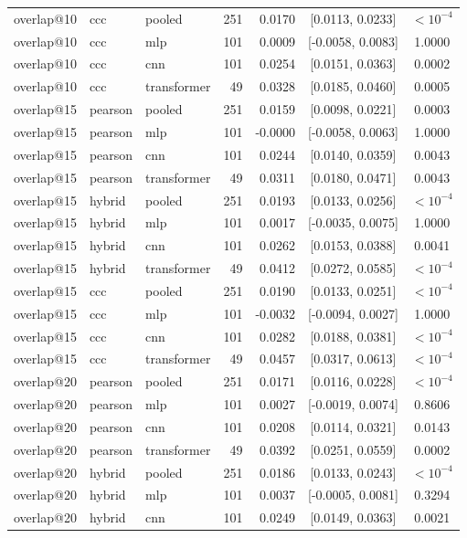 \begin{longtable}{lllrrcc}
overlap@10 & ccc & pooled & 251 & 0.0170 & [0.0113, 0.0233] & $<10^{-4}$ \\
overlap@10 & ccc & mlp & 101 & 0.0009 & [-0.0058, 0.0083] & 1.0000 \\
overlap@10 & ccc & cnn & 101 & 0.0254 & [0.0151, 0.0363] & 0.0002 \\
overlap@10 & ccc & transformer & 49 & 0.0328 & [0.0185, 0.0460] & 0.0005 \\
overlap@15 & pearson & pooled & 251 & 0.0159 & [0.0098, 0.0221] & 0.0003 \\
overlap@15 & pearson & mlp & 101 & -0.0000 & [-0.0058, 0.0063] & 1.0000 \\
overlap@15 & pearson & cnn & 101 & 0.0244 & [0.0140, 0.0359] & 0.0043 \\
overlap@15 & pearson & transformer & 49 & 0.0311 & [0.0180, 0.0471] & 0.0043 \\
overlap@15 & hybrid & pooled & 251 & 0.0193 & [0.0133, 0.0256] & $<10^{-4}$ \\
overlap@15 & hybrid & mlp & 101 & 0.0017 & [-0.0035, 0.0075] & 1.0000 \\
overlap@15 & hybrid & cnn & 101 & 0.0262 & [0.0153, 0.0388] & 0.0041 \\
overlap@15 & hybrid & transformer & 49 & 0.0412 & [0.0272, 0.0585] & $<10^{-4}$ \\
overlap@15 & ccc & pooled & 251 & 0.0190 & [0.0133, 0.0251] & $<10^{-4}$ \\
overlap@15 & ccc & mlp & 101 & -0.0032 & [-0.0094, 0.0027] & 1.0000 \\
overlap@15 & ccc & cnn & 101 & 0.0282 & [0.0188, 0.0381] & $<10^{-4}$ \\
overlap@15 & ccc & transformer & 49 & 0.0457 & [0.0317, 0.0613] & $<10^{-4}$ \\
overlap@20 & pearson & pooled & 251 & 0.0171 & [0.0116, 0.0228] & $<10^{-4}$ \\
overlap@20 & pearson & mlp & 101 & 0.0027 & [-0.0019, 0.0074] & 0.8606 \\
overlap@20 & pearson & cnn & 101 & 0.0208 & [0.0114, 0.0321] & 0.0143 \\
overlap@20 & pearson & transformer & 49 & 0.0392 & [0.0251, 0.0559] & 0.0002 \\
overlap@20 & hybrid & pooled & 251 & 0.0186 & [0.0133, 0.0243] & $<10^{-4}$ \\
overlap@20 & hybrid & mlp & 101 & 0.0037 & [-0.0005, 0.0081] & 0.3294 \\
overlap@20 & hybrid & cnn & 101 & 0.0249 & [0.0149, 0.0363] & 0.0021 \\

\end{longtable}
